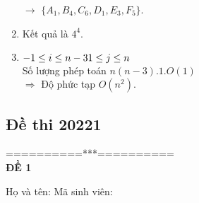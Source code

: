 \documentclass[12pt,oneside]{book}
\begin{document}
\begin{enumerate}[label = {\bf Câu \arabic*.}]
	$\rightarrow$ $\{A_1, B_4, C_6, D_1, E_3, F_5\}$.
	\item Kết quả là $4^4$.
	\item 
	$-1 \leq i \leq n - 3\\
	1 \leq j \leq n $\\
	Số lượng phép toán $n(n-3).1.O(1)$\\
	$\Rightarrow$ Độ phức tạp $O(n^2).$
	
\end{enumerate}

\subsection{Đề thi 20221}
\begin{center}
	==========***==========\\
	\textbf{ĐỀ 1}
\end{center}
\indent Họ và tên: \hspace{10cm}Mã sinh viên:
\end{document}
